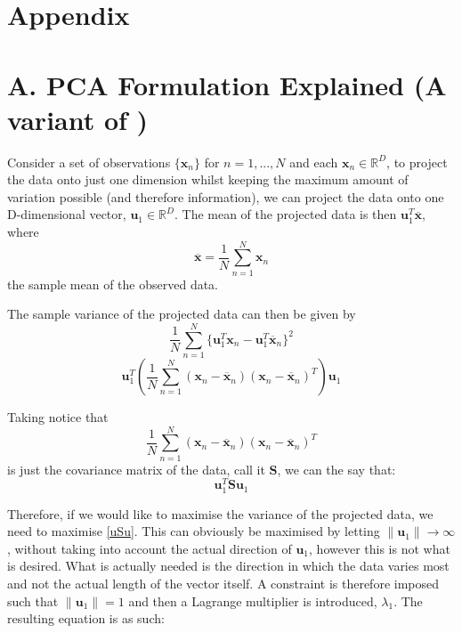 \documentclass[11pt,a4paper]{article}
\begin{document}


\clearpage

\section*{Appendix}\label{appendixa}

\appendix
{}

\section*{A. PCA Formulation Explained (A variant of \cite{bishop})}

Consider a set of observations $\{\mathbf{x}_n\}$ for $n = 1, ..., N$ and each $\mathbf{x}_n \in \mathbb{R}^D$, to project the data onto just one dimension whilst keeping the maximum amount of variation possible (and therefore information), we can project the data onto one D-dimensional vector, $\mathbf{u}_1 \in \mathbb{R}^D$. The mean of the projected data is then $\mathbf{u}_1^T \mathbf{\overline{x}}$, where
\begin{equation*}
\mathbf{\overline{x}} = \frac{1}{N} \sum_{n = 1}^N \mathbf{x}_n 
\end{equation*} 
the sample mean of the observed data.

The sample variance of the projected data can then be given by
\begin{equation*}
\frac{1}{N} \sum_{n = 1}^N \{\mathbf{u}_1^T\mathbf{x}_n -  \mathbf{u}_1^T\mathbf{\overline{x}}_n\}^2
\end{equation*} 
\begin{equation*}
\mathbf{u}_1^T \left( \frac{1}{N} \sum_{n = 1}^N \left(\mathbf{x}_n - \mathbf{\overline{x}}_n\right)\left(\mathbf{x}_n - \mathbf{\overline{x}}_n\right)^T \right) \mathbf{u}_1
\end{equation*} 

Taking notice that 
\begin{equation*}
\frac{1}{N} \sum_{n = 1}^N \left(\mathbf{x}_n - \mathbf{\overline{x}}_n\right)\left(\mathbf{x}_n - \mathbf{\overline{x}}_n\right)^T 
\end{equation*} 
is just the covariance matrix of the data, call it $\mathbf{S}$, we can the say that:
\begin{equation}
\mathbf{u}_1^T \mathbf{S} \mathbf{u}_1
\label{uSu}
\end{equation} 

Therefore, if we would like to maximise the variance of the projected data, we need to maximise \eqref{uSu}. This can obviously be maximised by letting $\|\mathbf{u}_1\| \to \infty$, without taking into account the actual direction of $\mathbf{u}_1$, however this is not what is desired. What is actually needed is the direction in which the data varies most and not the actual length of the vector itself. A constraint is therefore imposed such that $\|\mathbf{u}_1\| = 1$ and then a Lagrange multiplier is introduced, $\lambda_1$. The resulting equation is as such:
\end{document}
